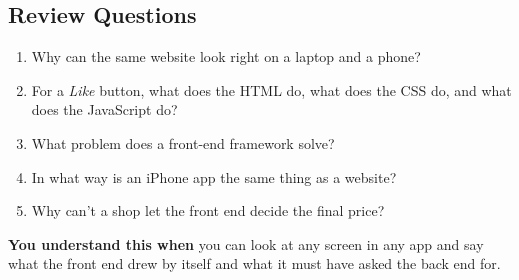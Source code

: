 \subsection*{Review Questions}\label{webapp-02:review-questions}

\begin{enumerate}
\def\labelenumi{\arabic{enumi}.}
\tightlist
\item
  Why can the same website look right on a laptop and a phone?
\item
  For a \emph{Like} button, what does the HTML do, what does the CSS do, and what does the JavaScript do?
\item
  What problem does a front-end framework solve?
\item
  In what way is an iPhone app the same thing as a website?
\item
  Why can't a shop let the front end decide the final price?
\end{enumerate}

\begin{notebox}

\textbf{You understand this when} you can look at any screen in any app and say what the front end drew by itself and what it must have asked the back end for.

\end{notebox}
